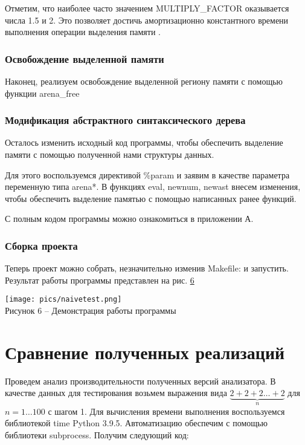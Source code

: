 \documentclass[bachelor, och, coursework]{SCWorks}
\begin{document}
    Отметим, что наиболее часто значением MULTIPLY\_FACTOR оказывается числа 
    1.5 и 2. Это позволяет достичь амортизационно константного времени 
    выполнения операции выделения памяти \cite{Facebook}.

    \subsubsection{Освобождение выделенной памяти}
    Наконец, реализуем освобождение выделенной региону памяти с помощью функции arena\_free

    \subsubsection{Модификация абстрактного синтаксического дерева}
    Осталось изменить исходный код программы, чтобы обеспечить выделение памяти с помощью полученной 
    нами структуры данных.

    Для этого воспользуемся директивой \%param и заявим в качестве параметра переменную типа arena*. 
    В функциях eval, newnum, newast внесем изменения, чтобы обеспечить выделение памятью с помощью 
    написанных ранее функций.

    С полным кодом программы можно ознакомиться в приложении А.%

    \subsubsection{Сборка проекта}
    Теперь проект можно собрать, незначительно изменив Makefile:
    и запустить. Результат работы программы представлен на рис. \hyperref[6]{6} 

    \begin{center}
        \texttt{[image: pics/naivetest.png]}\\
        {\small Рисунок 6 – Демонстрация работы программы}\label{6}
    \end{center}

    \section{Сравнение полученных реализаций}
    Проведем анализ производительности полученных версий анализатора. В 
    качестве данных для тестирования возьмем выражения вида $\underbrace{2 + 2 + 2 \dots + 2}_n $ 
    для $n = 1 \dots 100$ с шагом 1. Для вычисления времени выполнения воспользуемся библиотекой 
    time Python 3.9.5. Автоматизацию обеспечим с помощью библиотеки subprocess. Получим следующий код:
\end{document}
